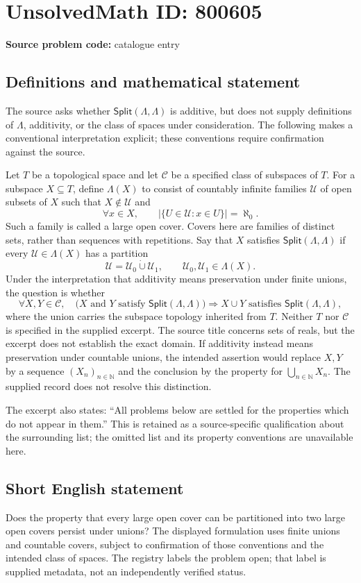 \documentclass[11pt]{article}
\newcommand{\N}{\mathbb{N}}
\begin{document}
\section*{UnsolvedMath ID: 800605}
\textbf{Source problem code:} catalogue entry
\subsection{Definitions and mathematical statement}
The source asks whether \(\mathsf{Split}(\Lambda,\Lambda)\) is additive, but does not supply definitions of \(\Lambda\), additivity, or the class of spaces under consideration. The following makes a conventional interpretation explicit; these conventions require confirmation against the source.

Let \(T\) be a topological space and let \(\mathcal C\) be a specified class of subspaces of \(T\). For a subspace \(X\subseteq T\), define \(\Lambda(X)\) to consist of countably infinite families \(\mathcal U\) of open subsets of \(X\) such that \(X\notin\mathcal U\) and
\[
\forall x\in X,\qquad \bigl|\{U\in\mathcal U:x\in U\}\bigr|=\aleph_0.
\]
Such a family is called a large open cover. Covers here are families of distinct sets, rather than sequences with repetitions. Say that \(X\) satisfies \(\mathsf{Split}(\Lambda,\Lambda)\) if every \(\mathcal U\in\Lambda(X)\) has a partition
\[
\mathcal U=\mathcal U_0\mathbin{\dot\cup}\mathcal U_1,
\qquad \mathcal U_0,\mathcal U_1\in\Lambda(X).
\]
Under the interpretation that additivity means preservation under finite unions, the question is whether
\[
\forall X,Y\in\mathcal C,\quad
\bigl(X\text{ and }Y\text{ satisfy }\mathsf{Split}(\Lambda,\Lambda)\bigr)
\Longrightarrow
X\cup Y\text{ satisfies }\mathsf{Split}(\Lambda,\Lambda),
\]
where the union carries the subspace topology inherited from \(T\). Neither \(T\) nor \(\mathcal C\) is specified in the supplied excerpt. The source title concerns sets of reals, but the excerpt does not establish the exact domain. If additivity instead means preservation under countable unions, the intended assertion would replace \(X,Y\) by a sequence \((X_n)_{n\in\N}\) and the conclusion by the property for \(\bigcup_{n\in\N}X_n\). The supplied record does not resolve this distinction.

The excerpt also states: ``All problems below are settled for the properties which do not appear in them.'' This is retained as a source-specific qualification about the surrounding list; the omitted list and its property conventions are unavailable here.
\subsection{Short English statement}
Does the property that every large open cover can be partitioned into two large open covers persist under unions? The displayed formulation uses finite unions and countable covers, subject to confirmation of those conventions and the intended class of spaces. The registry labels the problem open; that label is supplied metadata, not an independently verified status.
\end{document}
